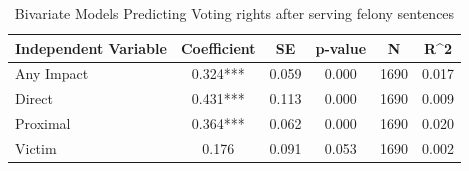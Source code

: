 \begin{table}

\caption{\label{tab:tab:q23_2_rev_bivariate}Bivariate Models Predicting Voting rights after serving felony sentences}
\centering
\begin{tabular}[t]{lccccc}
\toprule
Independent Variable & Coefficient & SE & p-value & N & R\textasciicircum{}2\\
\midrule
Any Impact & 0.324*** & 0.059 & 0.000 & 1690 & 0.017\\
Direct & 0.431*** & 0.113 & 0.000 & 1690 & 0.009\\
Proximal & 0.364*** & 0.062 & 0.000 & 1690 & 0.020\\
Victim & 0.176 & 0.091 & 0.053 & 1690 & 0.002\\
\bottomrule
\end{tabular}
\end{table}
